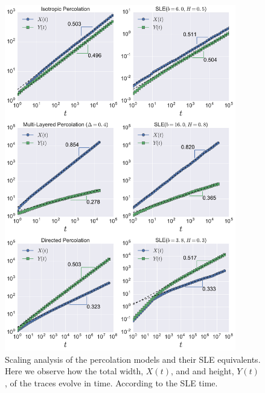 \begin{figure}
\begin{center}
    \includegraphics[width=0.9\textwidth]{chapters/ch6-asle/figs/timescaling}
\end{center}
\caption{Scaling analysis of the percolation models and their SLE equivalents.
    Here we observe how the total width, $X(t)$, and and height, $Y(t)$, of the
    traces evolve in time. According to the SLE time.}
\label{fig:timescaling}
\end{figure}

